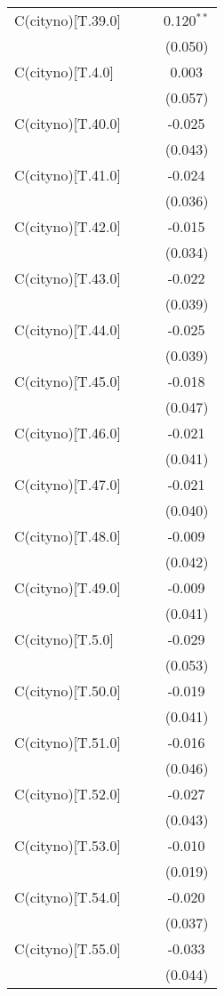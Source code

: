 \begin{table}[!htbp]
\begin{tabular}{@{\extracolsep{5pt}}lccc}
 C(cityno)[T.39.0] & & & 0.120$^{**}$ \\
& & & (0.050) \\
 C(cityno)[T.4.0] & & & 0.003$^{}$ \\
& & & (0.057) \\
 C(cityno)[T.40.0] & & & -0.025$^{}$ \\
& & & (0.043) \\
 C(cityno)[T.41.0] & & & -0.024$^{}$ \\
& & & (0.036) \\
 C(cityno)[T.42.0] & & & -0.015$^{}$ \\
& & & (0.034) \\
 C(cityno)[T.43.0] & & & -0.022$^{}$ \\
& & & (0.039) \\
 C(cityno)[T.44.0] & & & -0.025$^{}$ \\
& & & (0.039) \\
 C(cityno)[T.45.0] & & & -0.018$^{}$ \\
& & & (0.047) \\
 C(cityno)[T.46.0] & & & -0.021$^{}$ \\
& & & (0.041) \\
 C(cityno)[T.47.0] & & & -0.021$^{}$ \\
& & & (0.040) \\
 C(cityno)[T.48.0] & & & -0.009$^{}$ \\
& & & (0.042) \\
 C(cityno)[T.49.0] & & & -0.009$^{}$ \\
& & & (0.041) \\
 C(cityno)[T.5.0] & & & -0.029$^{}$ \\
& & & (0.053) \\
 C(cityno)[T.50.0] & & & -0.019$^{}$ \\
& & & (0.041) \\
 C(cityno)[T.51.0] & & & -0.016$^{}$ \\
& & & (0.046) \\
 C(cityno)[T.52.0] & & & -0.027$^{}$ \\
& & & (0.043) \\
 C(cityno)[T.53.0] & & & -0.010$^{}$ \\
& & & (0.019) \\
 C(cityno)[T.54.0] & & & -0.020$^{}$ \\
& & & (0.037) \\
 C(cityno)[T.55.0] & & & -0.033$^{}$ \\
& & & (0.044) \\

\end{tabular}
\end{table}
